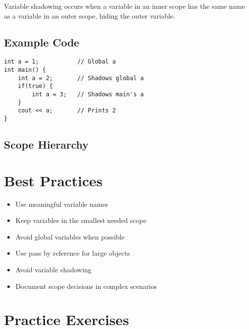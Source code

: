 \documentclass{article}
\begin{document}
\begin{warningbox}
Variable shadowing occurs when a variable in an inner scope has the same name as a variable in an outer scope, hiding the outer variable.
\end{warningbox}

\subsection{Example Code}
\begin{lstlisting}
int a = 1;           // Global a
int main() {
    int a = 2;       // Shadows global a
    if(true) {
        int a = 3;   // Shadows main's a
    }
    cout << a;       // Prints 2
}
\end{lstlisting}

\subsection{Scope Hierarchy}
\begin{center}
\end{center}

\section{Best Practices}

\begin{itemize}
    \item Use meaningful variable names
    \item Keep variables in the smallest needed scope
    \item Avoid global variables when possible
    \item Use pass by reference for large objects
    \item Avoid variable shadowing
    \item Document scope decisions in complex scenarios
\end{itemize}

\section{Practice Exercises}
\end{document}
